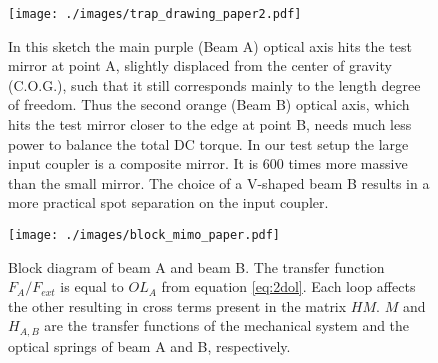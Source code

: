 \documentclass[%
 reprint,
 amsmath,amssymb,
 aps,
]{revtex4-1}
\begin{document}
\begin{figure}[t]
	\centering
		\texttt{[image: ./images/trap\_drawing\_paper2.pdf]}
	\caption{
	In this sketch the main purple (Beam A) optical axis hits the test mirror %
	at point A, slightly displaced from the center of gravity (C.O.G.), such
	 that it still corresponds mainly to the length degree of freedom. Thus the second orange (Beam B) optical axis, which hits the test mirror closer to the edge at point B, needs much less power to balance the total DC torque. In our test setup the large input coupler is a composite mirror. It is 600 times more massive than the small mirror. The choice of a V-shaped beam B results in a more practical spot separation on the input coupler. }	


	
	\label{fig:angular}
\end{figure}



\begin{figure}[htbp]
		\texttt{[image: ./images/block\_mimo\_paper.pdf]}
	\caption{Block diagram of beam A and beam B. The transfer function $F_A/F_{ext}$ is equal to $OL_A$ from equation \ref{eq:2dol}. Each loop affects the other resulting in cross terms
	present in the matrix $HM$. $M$ and $H_{A,B}$ are the transfer functions of the mechanical system and the optical springs of beam A and B, respectively.}
	\label{fig:block_loops}
\end{figure}

\end{document}
